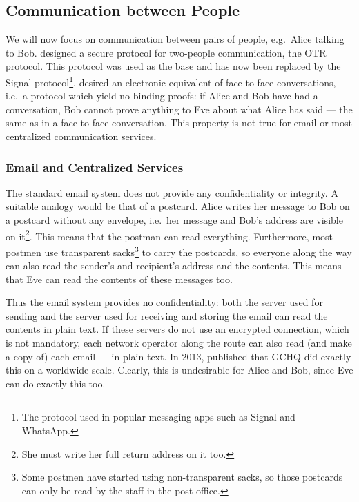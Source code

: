 \subsection{Communication between People}
\label{Communicating}

We will now focus on communication between pairs of people, e.g.\ Alice talking 
to Bob.
\citeauthor{otr2004} designed a secure protocol for two-people communication, 
the \ac{OTR} protocol.
This protocol was used as the base and has now been replaced by the Signal 
protocol\footnote{%
  The protocol used in popular messaging apps such as Signal and WhatsApp.
}.
\citeauthor{otr2004} desired an electronic equivalent of face-to-face 
conversations, i.e.\ a protocol which yield no binding proofs:
if Alice and Bob have had a conversation, Bob cannot prove anything to Eve 
about what Alice has said --- the same as in a face-to-face conversation.
This property is not true for email or most centralized communication
services.

\subsubsection{Email and Centralized Services}

The standard email system does not provide any confidentiality or 
integrity.
A suitable analogy would be that of a postcard.
Alice writes her message to Bob on a postcard without any envelope, i.e.\ her 
message and Bob's address are visible on it\footnote{%
  She must write her full return address on it too.
}.
This means that the postman can read everything.
Furthermore, most postmen use transparent sacks\footnote{%
  Some postmen have started using non-transparent sacks, so those postcards can 
  only be read by the staff in the post-office.
} to carry the postcards, so everyone along the way can also read the sender's 
and recipient's address and the contents.
This means that Eve can read the contents of these messages too.

Thus the email system provides no confidentiality: both the server used for 
sending and the server used for receiving and storing the email can read the 
contents in plain text.
If these servers do not use an encrypted connection, which is not mandatory, 
each network operator along the route can also read (and make a copy of) each 
email --- in plain text.
In 2013, \textcite{Fibretap} published that \ac{GCHQ} did exactly this on 
a worldwide scale.
Clearly, this is undesirable for Alice and Bob, since Eve can do exactly this 
too.

